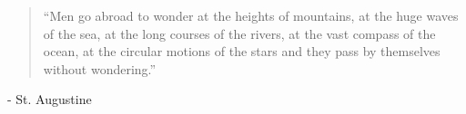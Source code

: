 \pagestyle{empty}
\vspace*{\fill}
\begin{quotation}
    \noindent ``Men go abroad to wonder at the heights of mountains, at the huge
    waves of the sea, at the long courses of the rivers, at the vast compass of
    the ocean, at the circular motions of the stars and they pass by themselves
    without wondering.''
\end{quotation}
\begin{flushright}
    - St. Augustine
\end{flushright}
\vspace*{\fill}
\newpage
